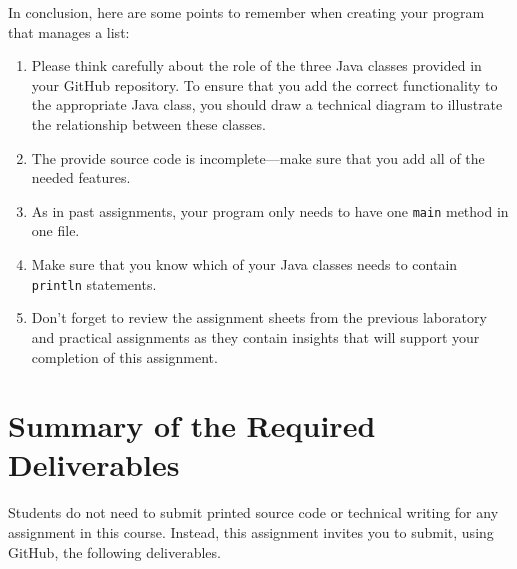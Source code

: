 \documentclass[11pt]{article}
\newcommand{\command}[1]{``\lstinline{#1}''}
\begin{document}
\noindent
In conclusion, here are some points to remember when creating your program that manages a list:

\begin{enumerate}
  \setlength{\itemsep}{0pt}

\item Please think carefully about the role of the three Java classes provided
  in your GitHub repository. To ensure that you add the correct functionality to
  the appropriate Java class, you should draw a technical diagram to illustrate
  the relationship between these classes.

\item The provide source code is incomplete---make sure that you add all of the
  needed features.

\item As in past assignments, your program only needs to have one {\tt main}
  method in one file.

\item Make sure that you know which of your Java classes needs to contain {\tt
  println} statements.

\item Don't forget to review the assignment sheets from the previous laboratory
  and practical assignments as they contain insights that will support your
  completion of this assignment.



\end{enumerate}

\section*{Summary of the Required Deliverables}

\noindent Students do not need to submit printed source code or technical
writing for any assignment in this course. Instead, this assignment invites you
to submit, using GitHub, the following deliverables.
\end{document}
